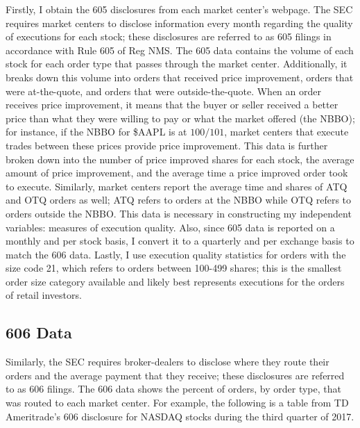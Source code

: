 \documentclass[11pt,a4paper]{article}
\begin{document}
		Firstly, I obtain the 605 disclosures from each market center's webpage. The SEC requires market centers to disclose information every month regarding the quality of executions for each stock; these disclosures are referred to as 605 filings in accordance with Rule 605 of Reg NMS. The 605 data contains the volume of each stock for each order type that passes through the market center. Additionally, it breaks down this volume into orders that received price improvement, orders that were at-the-quote, and orders that were outside-the-quote. When an order receives price improvement, it means that the buyer or seller received a better price than what they were willing to pay or what the market offered (the NBBO); for instance, if the NBBO for \$AAPL is at $100/101$, market centers that execute trades between these prices provide price improvement. This data is further broken down into the number of price improved shares for each stock, the average amount of price improvement, and the average time a price improved order took to execute. Similarly, market centers report the average time and shares of ATQ and OTQ orders as well; ATQ refers to orders at the NBBO while OTQ refers to orders outside the NBBO. This data is necessary in constructing my independent variables: measures of execution quality. Also, since 605 data is reported on a monthly and per stock basis, I convert it to a quarterly and per exchange basis to match the 606 data. Lastly, I use execution quality statistics for orders with the size code 21, which refers to orders between 100-499 shares; this is the smallest order size category available and likely best represents executions for the orders of retail investors. 
		
	\subsection{606 Data}
	
		Similarly, the SEC requires broker-dealers to disclose where they route their orders and the average payment that they receive; these disclosures are referred to as 606 filings. The 606 data shows the percent of orders, by order type, that was routed to each market center. For example, the following is a table from TD Ameritrade's 606 disclosure for NASDAQ stocks during the third quarter of 2017. 
		

		\vspace{1em}
\end{document}
